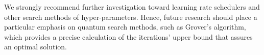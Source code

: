 \documentclass[a4paper, 12 pt, conference]{ieeeconf}
\begin{document}
	  \quad We strongly recommend further investigation toward learning rate schedulers and other search methods of hyper-parameters. Hence, future research should place a particular emphasis on quantum search methods, such as Grover's algorithm, which provides a precise calculation of the iterations' upper bound that assures an optimal solution.
\printbibliography
\end{document}
